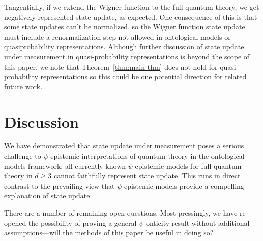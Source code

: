 \documentclass[%
 reprint,
superscriptaddress,
nofootinbib,
 amsmath,amssymb,
 prx, 
 accepted=2019-09-27,
]{quantumarticle}
\newcommand{\Z}{\mathbb{Z}}
\renewcommand{\Pr}{\textup{Pr}}
\newcommand{\proj}[1]{{\bm[}#1{\bm]}}
\begin{document}
Tangentially, if we extend the Wigner function to the full quantum
theory, we get negatively represented state update, as expected. One
consequence of this is that some state updates can't be normalized, so
the Wigner function state update must include a renormalization step
not allowed in ontological models or quasiprobability representations.
Although further discussion of state update under measurement in
quasi-probability representations is beyond the scope of this paper,
we note that Theorem~\ref{thm:main-thm} does not hold for
quasi-probability representations so this could be one potential
direction for related future work.


\section{Discussion}
\label{sec:discussion}
  
We have demonstrated that state update under measurement poses a
serious challenge to $\psi$-epistemic interpretations of quantum
theory in the ontological models framework: all currently known
$\psi$-epistemic models for full quantum theory in $d\geq3$ cannot
faithfully represent state update. This runs in direct contrast to the
prevailing view that $\psi$-epistemic models provide a compelling
explanation of state update.

There are a number of remaining open questions. Most pressingly, we
have re-opened the possibility of proving a general $\psi$-onticity
result without additional assumptions---will the methods of this paper be
useful in doing so?
\end{document}
